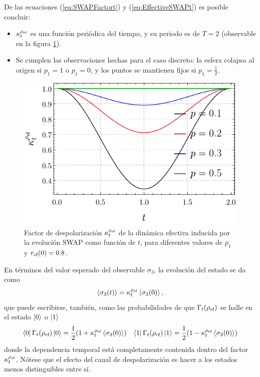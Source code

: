 De las ecuaciones (\ref{eq:SWAPFactort}) y (\ref{eq:EffectiveSWAPt}) es posible concluir:
\begin{itemize}
  \item $\kappa_{t}^{\rho_{\text{ef}}}$ es una función periódica del tiempo, y su periodo es de $T=2$ (observable en la figura \ref{fig:SWAPFactor2Dt}).
  \item Se cumplen las observaciones hechas para el caso discreto: la esfera colapsa al origen si $p_{1}=1$ o $p_{1}=0$, y los puntos se mantienen fijos si $p_{1}=\frac{1}{2}$.
\end{itemize}

\begin{figure}[ht!]
  \centering
  \includegraphics[width=0.6\linewidth]{chapter4/figures_toy/K(t).pdf}
  \caption{Factor de despolarización $\kappa_{t}^{\rho_{\text{ef}}}$ de la dinámica efectiva inducida por la evolución SWAP como función de $t$, para diferentes valores de $p_{1}$ y $r_{\text{ef}}(0)=0.8$.}
  \label{fig:SWAPFactor2Dt}
\end{figure}

En términos del valor esperado del observable $\sigma_{3}$, la evolución del estado se da como
\begin{equation}
  \expval{\sigma_{3}(t)}=\kappa_{t}^{\rho_{\text{ef}}}\expval{\sigma_{3}(0)},\nonumber
\end{equation}
que puede escribirse, también, como las probabilidades de que $\Gamma_{t}(\rho_{\text{ef}})$ se halle en el estado $\ket{0}$ o $\ket{1}$
 \begin{align}
  \bra{0}\Gamma_{t}(\rho_{\text{ef}})\ket{0}=\frac{1}{2}(1+\kappa_{t}^{\rho_{\text{ef}}}\expval{\sigma_{3}(0)}) && \bra{1}\Gamma_{t}(\rho_{\text{ef}})\ket{1}=\frac{1}{2}(1-\kappa_{t}^{\rho_{\text{ef}}}\expval{\sigma_{3}(0)})\nonumber
 \end{align}
 donde la dependencia temporal está completamente contenida dentro del factor $\kappa_{t}^{\rho_{\text{ef}}}$. Nótese que el efecto del canal de despolarización es hacer a los estados menos distinguibles entre sí.


